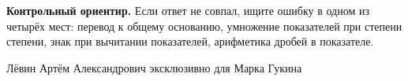 \documentclass[a4paper,12pt]{article}
\begin{document}
\vspace{10mm}
\textbf{Контрольный ориентир.} Если ответ не совпал, ищите ошибку в одном из четырёх мест: перевод к общему основанию, умножение показателей при степени степени, знак при вычитании показателей, арифметика дробей в показателе.

\vfill
\begin{center}
{\color{softgray}\small Лёвин Артём Александрович эксклюзивно для Марка Гукина}
\end{center}
\end{document}
